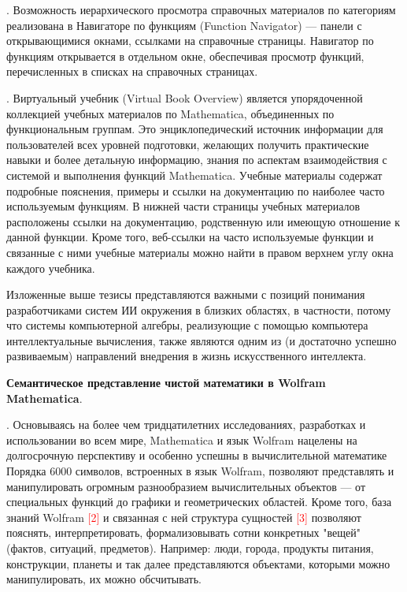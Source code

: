 . Возможность иерархического просмотра справочных материалов по категориям реализована в Навигаторе по функциям (Function Navigator) --- панели с открывающимися окнами, ссылками на справочные страницы. Навигатор по функциям открывается в отдельном окне, обеспечивая просмотр функций, перечисленных в списках на справочных страницах.

. 
Виртуальный учебник (Virtual Book Overview) является упорядоченной коллекцией учебных материалов по Mathematica, объединенных по функциональным группам. Это энциклопедический источник информации для пользователей всех уровней подготовки, желающих получить практические навыки и более детальную информацию, знания по аспектам взаимодействия с системой и выполнения функций Mathematica.
Учебные материалы содержат подробные пояснения, примеры и ссылки на документацию по наиболее часто используемым функциям. В нижней части страницы учебных материалов расположены ссылки на документацию, родственную или имеющую отношение к данной функции. Кроме того, веб-ссылки на часто используемые функции и связанные с ними учебные материалы можно найти в правом верхнем углу окна каждого учебника.

Изложенные выше тезисы представляются важными с позиций понимания разработчиками систем ИИ окружения в близких областях, в частности, потому что системы компьютерной алгебры, реализующие с помощью компьютера интеллектуальные вычисления, также являются одним из (и достаточно успешно развиваемым) направлений внедрения в жизнь искусственного интеллекта.

\textbf{Семантическое представление чистой математики в Wolfram Mathematica}.

. 
Основываясь на более чем тридцатилетних исследованиях, разработках и использовании во всем мире, Mathematica и язык Wolfram нацелены на долгосрочную перспективу и особенно успешны в вычислительной математике
Порядка 6000 символов, встроенных в язык Wolfram, позволяют представлять и манипулировать огромным разнообразием вычислительных объектов --- от специальных функций до графики и геометрических областей.
Кроме того, база знаний Wolfram \textcolor{red}{[2]} и связанная с ней структура сущностей \textcolor{red}{[3]} позволяют пояснять, интерпретировать, формализовывать сотни конкретных "вещей"{} (фактов, ситуаций, предметов). Например: люди, города, продукты питания, конструкции, планеты и так далее представляются объектами, которыми можно манипулировать, их можно обсчитывать. 

